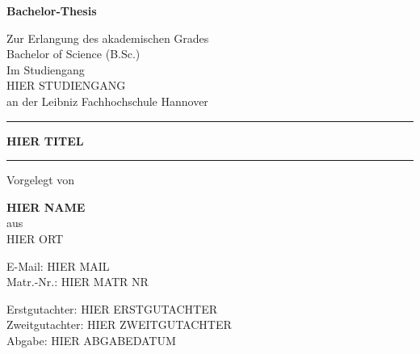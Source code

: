 \begin{titlepage}
    \thispagestyle{empty}
    \begin{center}
        \centering


        {
            \LARGE{
                \textbf{Bachelor-Thesis}
                \vspace{0.5cm}
            }

            \Large{
                Zur Erlangung des akademischen Grades\\
                \glqq Bachelor of Science (B.Sc.)\grqq{}
            }\\
            \large{
                \vspace{0.5cm}
                Im Studiengang\\
                HIER STUDIENGANG\\
                an der Leibniz Fachhochschule Hannover
            }
            \par
        }

        \vfill

        \noindent\rule[1ex]{\textwidth}{1pt}
        \LARGE{
            \textbf{HIER TITEL}
        }
        \noindent\rule[1ex]{\textwidth}{1pt}
        \vfill


        \large{
            Vorgelegt von

            \textbf{HIER NAME}\\
            aus\\
            HIER ORT

            E-Mail: HIER MAIL\\
            Matr.-Nr.: HIER MATR NR
        }
        \vfill
        \large{
            Erstgutachter: HIER ERSTGUTACHTER\\
            Zweitgutachter: HIER ZWEITGUTACHTER\\
            
            Abgabe: HIER ABGABEDATUM
        }
    \end{center}

\end{titlepage}